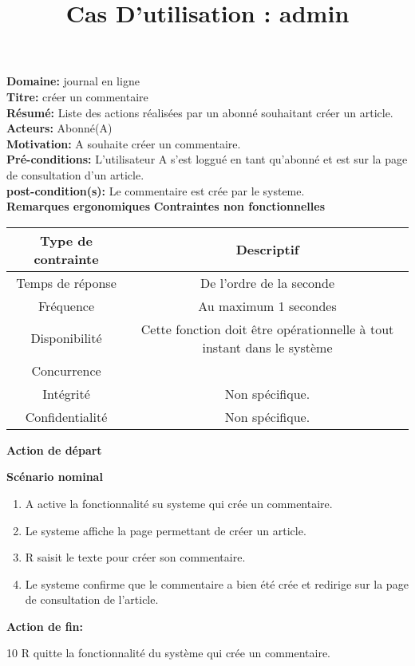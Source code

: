 \documentclass[a4paper,10pt]{article}
\title{Cas D'utilisation : admin}
\author{}
\begin{document}
\maketitle



\textbf{Domaine:} journal en ligne\\
\textbf{Titre:} créer un commentaire\\
\textbf{Résumé:} Liste des actions réalisées par un abonné souhaitant créer un article.\\
\textbf{Acteurs:} Abonné(A)\\
\textbf{Motivation:} A souhaite créer un commentaire.\\
\textbf{Pré-conditions:} L'utilisateur A s'est loggué en tant qu'abonné et est sur la page de consultation
d'un article.\\
\textbf{post-condition(s):} Le commentaire est crée par le systeme.\\

\textbf{Remarques ergonomiques}
\textbf{Contraintes non fonctionnelles}
\begin{center}
  \begin{tabular}{|c|c|}
\hline
   \textbf{Type de contrainte}&\textbf{Descriptif}\\
\hline
Temps de réponse&De l'ordre de la seconde\\
\hline
Fréquence & Au maximum 1 secondes\\
\hline
Disponibilité & Cette fonction doit être opérationnelle à tout instant dans le système\\
\hline
Concurrence&\\
\hline
Intégrité&Non spécifique.\\
\hline
Confidentialité& Non spécifique.\\
\hline

  \end{tabular}
\end{center}

\textbf{Action de départ}

\textbf{Scénario nominal}
\begin{enumerate}
\item A active la fonctionnalité su systeme qui crée un commentaire.
\item Le systeme affiche la page permettant de créer un article. 
\item R saisit le texte pour créer son commentaire.
\item Le systeme confirme que le commentaire a bien été crée et redirige sur la page de consultation de l'article.
\end{enumerate}

\textbf{Action de fin:}

10 R quitte la fonctionnalité du système qui crée un commentaire.
\end{document}
